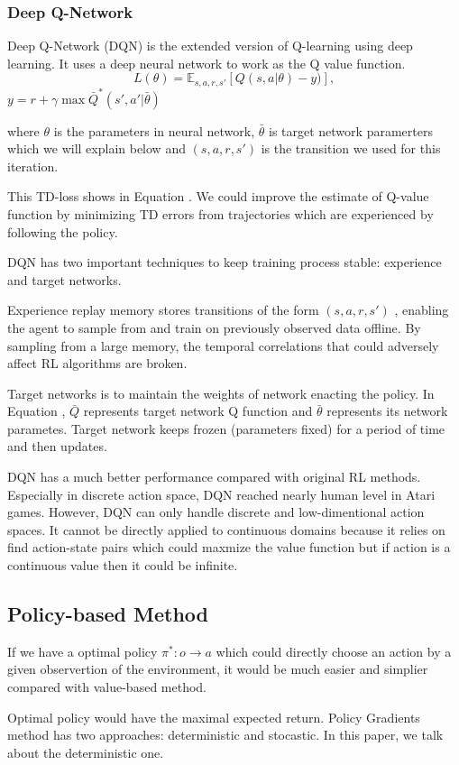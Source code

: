 \documentclass[11pt,twocolumn]{jarticle} %
\begin{document}
\subsubsection{Deep Q-Network\cite{dqn}}

Deep Q-Network (DQN) is the extended version of Q-learning using deep learning. It uses a deep neural network to work as the Q value function. 
\begin{equation} \label{eq:dqn-loss}
L(\theta) = \mathbb{E}_{s,a,r,s'}[Q(s, a|\theta) - y)],  
\end{equation}
$ y = r + \gamma\max \bar{Q}^*(s', a'|\bar{\theta})$

where $\theta$ is the parameters in neural network, $\bar{\theta}$ is target network paramerters which we will explain below and $(s,a,r,s')$ is the transition we used for this iteration. \par

This TD-loss shows in Equation \label{eq:dqn-loss}. We could improve the estimate of Q-value function by minimizing TD errors from trajectories which are experienced by following the policy. \par
DQN has two important techniques to keep training process stable: experience and target networks.\par
Experience replay \cite{replay} memory stores transitions of the form $(s,a,r,s')$ , enabling the agent to sample from and train on previously observed data offline. By sampling from a large memory, the temporal correlations that could adversely affect RL algorithms are broken. \par
Target networks \cite{qlearning} is to maintain the weights of network enacting the policy. In Equation \label{eq:dqn-loss}, $\bar{Q}$ represents target network Q function and $\bar{\theta}$ represents its network parametes. Target network keeps frozen (parameters fixed) for a period of time and then updates. \par

DQN has a much better performance compared with original RL methods. Especially in discrete action space, DQN reached nearly human level in Atari games. However, DQN can only handle discrete and low-dimentional action spaces. It cannot be directly applied to continuous domains because it relies on find action-state pairs which could maxmize the value function but if action is a continuous value then it could be infinite. \par

\subsection{Policy-based Method}
If we have a optimal policy $\pi^*: o \rightarrow a$ which could directly choose an action by a given observertion of the environment, it would be much easier and simplier compared with value-based method. \par
Optimal policy would have the maximal expected return.
Policy Gradients method has two approaches: deterministic and stocastic. In this paper, we talk about the deterministic one.
\end{document}
